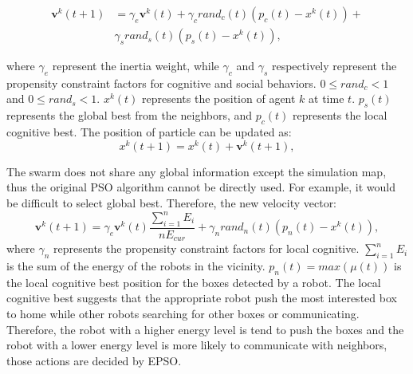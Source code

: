 \documentclass[journal]{IEEEtran}
\begin{document}
\begin{equation}
\begin{split}
\mathbf{v}^{k}(t+1) &= \gamma_{e}\mathbf{v}^{k}(t) + \gamma_{c}rand_{c}(t)(p_{c}(t)-x^{k}(t)) +\\
&\gamma_{s}rand_{s}(t)(p_{s}(t)-x^{k}(t)),
\end{split}
\label{eq:04}
\end{equation}

where $\gamma_e$ represent the inertia weight, while $\gamma_c$ and $\gamma_s$ respectively represent the propensity constraint factors for cognitive and social behaviors. $0 \leq rand_c < 1$ and $0 \leq rand_s < 1$. $x^{k}(t)$ represents the position of agent $k$ at time $t$. $p_{s}(t)$ represents the global best from the neighbors, and $p_{c}(t)$ represents the local cognitive best. The position of particle can be updated as:
%
\begin{equation}
x^{k}(t+1) = x^{k}(t) + \mathbf{v}^{k}(t+1),
\label{eq:05}
\end{equation}

The swarm does not share any global information except the simulation map, thus the original PSO algorithm cannot be directly used. For example, it would be difficult to select global best. Therefore, the new velocity vector:
%
\begin{equation}
\mathbf{v}^{k}(t+1) = \gamma_{e}\mathbf{v}^{k}(t)\frac{\sum^n_{i=1}E_i}{nE_{cur}} + \gamma_{n}rand_{n}(t)(p_{n}(t)-x^{k}(t)),
\label{eq:06}
\end{equation}
%
where $\gamma_n$ represents the propensity constraint factors for local cognitive. $\sum^n_{i=1}E_i$ is the sum of the energy of the robots in the vicinity. $p_n(t)=max(\mu(t))$ is the local cognitive best position for the boxes detected by a robot.
The local cognitive best suggests that the appropriate robot push the most interested box to home while other robots searching for other boxes or communicating. Therefore, the robot with a higher energy level is tend to push the boxes and the robot with a lower energy level is more likely to communicate with neighbors, those actions are decided by EPSO.
\end{document}
